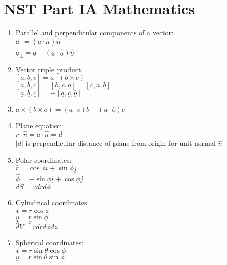 \documentclass[fleqn]{article}
\author{Victor Zhao\\xz398@cam.ac.uk}
\begin{document}
\centering
\section*{NST Part IA Mathematics}
\MyAuthor

\begin{enumerate}
	\item Parallel and perpendicular components of a vector:\\
		$\underline{a}_\parallel=(\underline{a}\cdot\underline{\hat{n}})\underline{\hat{n}}$\\
		$\underline{a}_\perp=\underline{a}-(\underline{a}\cdot\underline{\hat{n}})\underline{\hat{n}}$
	\item Vector triple product:\\
		$[\underline{a},\underline{b},\underline{c}]=\underline{a}\cdot(\underline{b}\times\underline{c})$\\
		$[\underline{a},\underline{b},\underline{c}]=[\underline{b},\underline{c},\underline{a}]=[\underline{c},\underline{a},\underline{b}]$\\
		$[\underline{a},\underline{b},\underline{c}]=-[\underline{a},\underline{c},\underline{b}]$
	\item $\underline{a}\times(\underline{b}\times\underline{c})=(\underline{a}\cdot\underline{c})\underline{b}-(\underline{a}\cdot\underline{b})\underline{c}$
	\item Plane equation:\\
		$\underline{r}\cdot\underline{\hat{n}}=\underline{a}\cdot\underline{\hat{n}}=d$\\
		$|$$d$$|$ is perpendicular distance of plane from origin for unit normal $\underline{\hat{n}}$
	\item Polar coordinates:\\
		$\underline{\hat{r}}=\cos\phi\underline{i}+\sin\phi\underline{j}$\\
		$\underline{\hat{\phi}}=-\sin\phi\underline{i}+\cos\phi\underline{j}$\\
		$dS=rdrd\phi$
	\item Cylindrical coordinates:\\
		$x=r\cos\phi$\\
		$y=r\sin\phi$\\
		$z=z$\\
		$dV=rdrd\phi dz$
	\item Spherical coordinates:\\
		$x=r\sin\theta\cos\phi$\\
		$y=r\sin\theta\sin\phi$\\

\end{enumerate}
\end{document}

